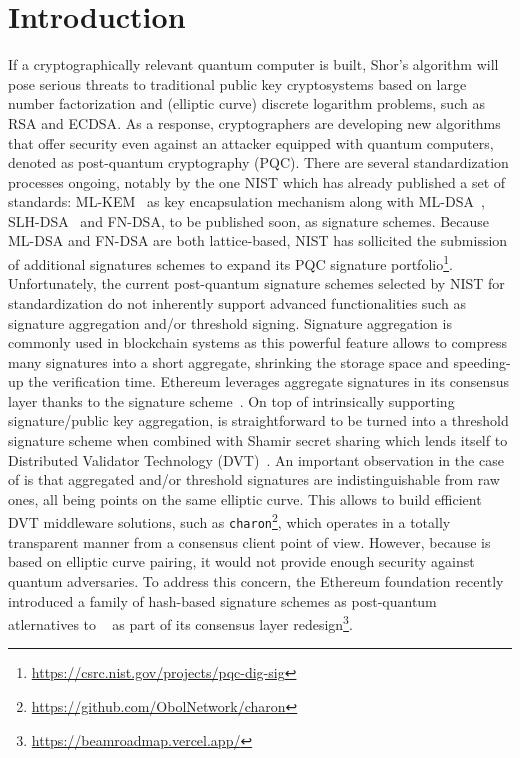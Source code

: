 \section{Introduction}
If a cryptographically relevant quantum computer is built, Shor’s algorithm will pose serious threats to traditional public key cryptosystems based on large number factorization and (elliptic curve) discrete logarithm problems, such as \textsf{RSA} and \textsf{ECDSA}.
As a response, cryptographers are developing new algorithms that offer security even against an attacker equipped with quantum computers, denoted as post-quantum cryptography (PQC).
There are several standardization processes ongoing, notably by the one NIST which has already published a set of standards: ML-KEM~\cite{fips203} as key encapsulation mechanism along with \textsf{ML-DSA}~\cite{fips204}, \textsf{SLH-DSA}~\cite{fips205} and \textsf{FN-DSA}, to be published soon, as signature schemes.
Because \textsf{ML-DSA} and \textsf{FN-DSA} are both lattice-based, NIST has sollicited the submission of additional signatures schemes to expand its PQC signature portfolio\footnote{\url{https://csrc.nist.gov/projects/pqc-dig-sig}}.
Unfortunately, the current post-quantum signature schemes selected by NIST for standardization do not inherently support advanced functionalities such as signature aggregation and/or threshold signing.
Signature aggregation is commonly used in blockchain systems as this powerful feature allows to compress many signatures into a short aggregate, shrinking the storage space and speeding-up the verification time.
Ethereum leverages  aggregate signatures in its consensus layer thanks to the \BLS signature scheme~\cite{bls2001}.
On top of intrinsically supporting signature/public key aggregation, \BLS is straightforward to be turned into a threshold signature scheme when combined with Shamir secret sharing which lends itself to Distributed Validator Technology (DVT)~\cite{DVT}.
An important observation in the case of \BLS is that aggregated and/or threshold \BLS signatures are indistinguishable from raw ones, all being points on the same elliptic curve.
This allows to build efficient DVT middleware solutions, such as \texttt{charon}\footnote{\url{https://github.com/ObolNetwork/charon}}, which operates in a totally transparent manner from a consensus client point of view.
However, because \BLS is based on elliptic curve pairing, it would not provide enough security against quantum adversaries.
To address this concern, the Ethereum foundation recently introduced a family of hash-based signature schemes as post-quantum atlernatives to \BLS~\cite{cryptoeprint:2025/055} as part of its consensus layer redesign\footnote{\url{https://beamroadmap.vercel.app/}}.
